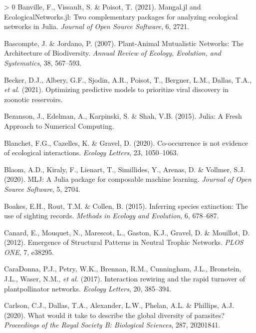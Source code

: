 \documentclass[11pt]{article}
\newlength{\cslhangindent}
\newenvironment{CSLReferences}[3] %
 {%
  \setlength{\parindent}{0pt}
  \ifodd #1 \everypar{\setlength{\hangindent}{\cslhangindent}}\ignorespaces\fi
  \ifnum #2 > 0
  \setlength{\parskip}{#2\baselineskip}
  \fi
 }%
 {}
\begin{document}
\hypertarget{refs}{}
\begin{CSLReferences}{1}{0}
\leavevmode\hypertarget{ref-Banville2021ManJl}{}%
Banville, F., Vissault, S. \& Poisot, T. (2021). Mangal.jl and
EcologicalNetworks.jl: Two complementary packages for analyzing
ecological networks in Julia. \emph{Journal of Open Source Software}, 6,
2721.

\leavevmode\hypertarget{ref-Bascompte2007PlaMut}{}%
Bascompte, J. \& Jordano, P. (2007). Plant-Animal Mutualistic Networks:
The Architecture of Biodiversity. \emph{Annual Review of Ecology,
Evolution, and Systematics}, 38, 567--593.

\leavevmode\hypertarget{ref-Becker2021OptPre}{}%
Becker, D.J., Albery, G.F., Sjodin, A.R., Poisot, T., Bergner, L.M.,
Dallas, T.A., \emph{et al.} (2021). Optimizing predictive models to
prioritize viral discovery in zoonotic reservoirs.

\leavevmode\hypertarget{ref-Bezanson2015JulFre}{}%
Bezanson, J., Edelman, A., Karpinski, S. \& Shah, V.B. (2015). Julia: A
Fresh Approach to Numerical Computing.

\leavevmode\hypertarget{ref-Blanchet2020CooNot}{}%
Blanchet, F.G., Cazelles, K. \& Gravel, D. (2020). Co-occurrence is not
evidence of ecological interactions. \emph{Ecology Letters}, 23,
1050--1063.

\leavevmode\hypertarget{ref-Blaom2020MljJul}{}%
Blaom, A.D., Kiraly, F., Lienart, T., Simillides, Y., Arenas, D. \&
Vollmer, S.J. (2020). MLJ: A Julia package for composable machine
learning. \emph{Journal of Open Source Software}, 5, 2704.

\leavevmode\hypertarget{ref-Boakes2015InfSpe}{}%
Boakes, E.H., Rout, T.M. \& Collen, B. (2015). Inferring species
extinction: The use of sighting records. \emph{Methods in Ecology and
Evolution}, 6, 678--687.

\leavevmode\hypertarget{ref-Canard2012EmeStr}{}%
Canard, E., Mouquet, N., Marescot, L., Gaston, K.J., Gravel, D. \&
Mouillot, D. (2012). Emergence of Structural Patterns in Neutral Trophic
Networks. \emph{PLOS ONE}, 7, e38295.

\leavevmode\hypertarget{ref-CaraDonna2017IntRew}{}%
CaraDonna, P.J., Petry, W.K., Brennan, R.M., Cunningham, J.L.,
Bronstein, J.L., Waser, N.M., \emph{et al.} (2017). Interaction rewiring
and the rapid turnover of plantpollinator networks. \emph{Ecology
Letters}, 20, 385--394.

\leavevmode\hypertarget{ref-Carlson2020WhaWou}{}%
Carlson, C.J., Dallas, T.A., Alexander, L.W., Phelan, A.L. \& Phillips,
A.J. (2020). What would it take to describe the global diversity of
parasites? \emph{Proceedings of the Royal Society B: Biological
Sciences}, 287, 20201841.


\end{CSLReferences}
\end{document}
